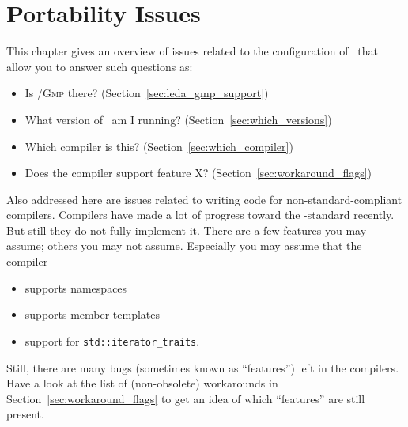 
\chapter{Portability Issues\label{chap:portability}}

This chapter gives an overview of issues related to the
configuration of \cgal\ that allow you to answer such questions as:
\begin{itemize}
\item Is \leda/\textsc{Gmp} there? (Section~\ref{sec:leda_gmp_support})
\item What version of \cgal\ am I running? (Section~\ref{sec:which_versions})
\item Which compiler is this? (Section~\ref{sec:which_compiler})
\item Does the compiler support feature X? (Section~\ref{sec:workaround_flags})
\end{itemize}

Also addressed here are issues related to writing code for 
non-standard-compliant compilers.  Compilers have made a lot of progress toward 
the \CC-standard recently.  But still they do not fully implement it. There 
are a few features you may assume; others you may not
assume. Especially you may assume that the compiler
\begin{itemize}
\item supports namespaces
\item supports member templates
\item support for \texttt{std::iterator\_traits}.
\end{itemize}
Still, there are many bugs (sometimes known as ``features'') left in the 
compilers.  Have a look at the list of (non-obsolete) workarounds in 
Section~\ref{sec:workaround_flags} to get an idea of which ``features'' are
still present.  

